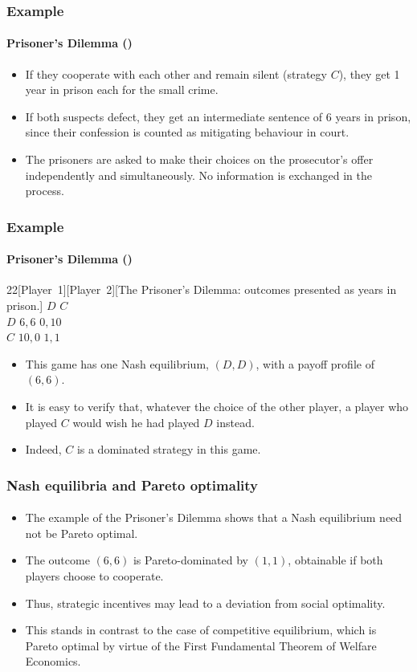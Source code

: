 \documentclass[10pt]{beamer}
\theoremstyle{definition}
\begin{document}
\begin{frame}[fragile]
\frametitle{Example }
\framesubtitle{Prisoner's Dilemma ()}
\begin{itemize}\itemsep1em
\item If they cooperate with each other and remain silent (strategy $ C $), they get 1 year in prison each for the small crime.
\item If both suspects defect, they get an intermediate sentence of 6 years in prison, since their confession is counted as mitigating behaviour in court.
\item The prisoners are asked to make their choices on the prosecutor's offer independently and simultaneously. No information is exchanged in the process.
\end{itemize}
\end{frame}

\begin{frame}[fragile]
\frametitle{Example }
\framesubtitle{Prisoner's Dilemma ()}
\begin{center}
\begin{game}{2}{2}[Player~1][Player~2][The Prisoner's Dilemma: outcomes presented as years in prison.]
 \> $ D $ \> $ C $ \\
$ D $ \> $ 6,6 $ \> $ 0,10 $ \\
$ C $ \> $ 10,0 $ \> $ 1,1 $
\end{game}
\end{center}\bigskip

\begin{itemize}\itemsep1em
\item This game has one Nash equilibrium, $ (D,D) $, with a payoff profile of $ (6,6) $.
\item It is easy to verify that, whatever the choice of the other player, a player who played $ C $ would wish he had played $ D $ instead.
\item Indeed, $ C $ is a dominated strategy in this game.
\end{itemize}
\end{frame}

\begin{frame}[fragile]
\frametitle{Nash equilibria and Pareto optimality}
\framesubtitle{}
\begin{itemize}\itemsep1em
\item The example of the Prisoner's Dilemma shows that a Nash equilibrium need not be Pareto optimal.
\item The outcome $ (6,6) $ is Pareto-dominated by $ (1,1) $, obtainable if both players choose to cooperate.
\item Thus, strategic incentives may lead to a deviation from social optimality.
\item This stands in contrast to the case of competitive equilibrium, which is Pareto optimal by virtue of the First Fundamental Theorem of Welfare Economics.
\end{itemize}
\end{frame}
\end{document}
